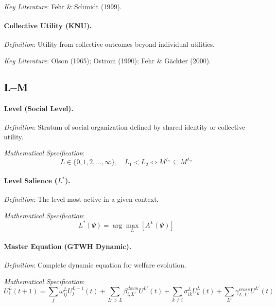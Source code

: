 \textit{Key Literature}: Fehr \& Schmidt (1999).

\medskip

\paragraph{Collective Utility (KNU).}
\textit{Definition}: Utility from collective outcomes beyond individual utilities.

\textit{Key Literature}: Olson (1965); Ostrom (1990); Fehr \& Gächter (2000).

\subsection*{L--M}

\paragraph{Level (Social Level).}
\textit{Definition}: Stratum of social organization defined by shared identity 
or collective utility.

\textit{Mathematical Specification}:
\begin{equation}
L \in \{0, 1, 2, ..., \infty\}, \quad L_1 < L_2 \iff M^{L_1} \subseteq M^{L_2}
\end{equation}

\medskip

\paragraph{Level Salience ($L^*$).}
\textit{Definition}: The level most active in a given context.

\textit{Mathematical Specification}:
\begin{equation}
L^*(\Psi) = \arg\max_L [A^L(\Psi)]
\end{equation}

\medskip

\paragraph{Master Equation (GTWH Dynamic).}
\textit{Definition}: Complete dynamic equation for welfare evolution.

\textit{Mathematical Specification}:
\begin{equation}
\boxed{
U^L_i(t+1) = \sum_{j} \omega^L_{ij} U^{L-1}_j(t) + 
\sum_{L'>L} \beta^{down}_{i,L'} U^{L'}(t) + 
\sum_{k \neq i} \sigma^L_{ik} U^L_k(t) + 
\sum_{L'} \gamma^{cross}_{L,L'} U^{L'}(t)
}
\end{equation}

